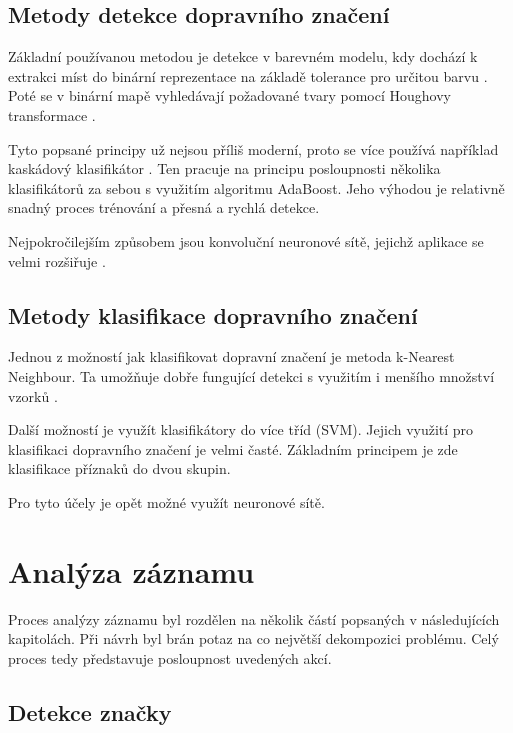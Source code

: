\documentclass[czech]{ExcelAtFIT} %
\begin{document}
\subsection{Metody detekce dopravního značení}
Základní používanou metodou je detekce v barevném modelu, kdy dochází k extrakci míst do binární reprezentace na základě tolerance pro určitou barvu \cite{color-detection}. Poté se v binární mapě vyhledávají požadované tvary pomocí Houghovy transformace \cite{hough-detection}.

Tyto popsané principy už nejsou příliš moderní, proto se více používá například kaskádový klasifikátor \cite{Viola-Jones}. Ten pracuje na principu posloupnosti několika klasifikátorů za sebou s využitím algoritmu AdaBoost. Jeho výhodou je relativně snadný proces trénování a přesná a rychlá detekce.

Nejpokročilejším způsobem jsou konvoluční neuronové sítě, jejichž aplikace se velmi rozšiřuje \cite{cnn}.



\subsection{Metody klasifikace dopravního značení}

Jednou z možností jak klasifikovat dopravní značení je metoda k-Nearest Neighbour. Ta umožňuje dobře fungující detekci s využitím i menšího množství vzorků \cite{knn}.

Další možností je využít klasifikátory do více tříd (SVM). Jejich využití pro klasifikaci dopravního značení je velmi časté. Základním principem je zde klasifikace příznaků do dvou skupin.

Pro tyto účely je opět možné využít neuronové sítě.


\section{Analýza záznamu}
Proces analýzy záznamu byl rozdělen na několik částí popsaných v následujících kapitolách. Při návrh byl brán potaz na co největší dekompozici problému. Celý proces tedy představuje posloupnost uvedených akcí.

\subsection{Detekce značky}
\end{document}
